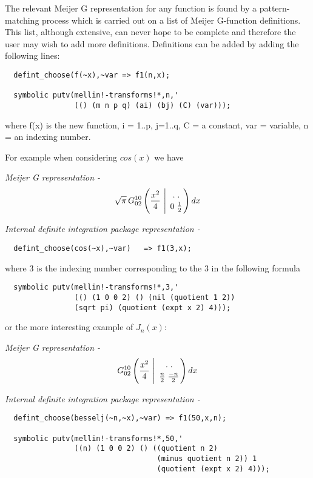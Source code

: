 The relevant Meijer G representation for any function is found by a 
pattern-matching process which is carried out on a list of Meijer 
G-function definitions. This list, although extensive, can never hope 
to be complete and therefore the user may wish to add more definitions.
Definitions can be added by adding the following lines:

\begin{verbatim}
  defint_choose(f(~x),~var => f1(n,x);

  symbolic putv(mellin!-transforms!*,n,'
                (() (m n p q) (ai) (bj) (C) (var)));

\end{verbatim} 
     where f(x) is the new function, i = 1..p, j=1..q, C = a constant,
     var = variable, n = an indexing number.

For example when considering $cos (x)$ we have

\it Meijer G representation  -  
\begin{displaymath}
\sqrt{\pi} \,G^{1 0}_{0 2}\left(\frac{x^{2}}{4} \ \Bigg\vert 
\ { . \; . \atop 0 \; \frac{1}{2}} \right) dx 
\end{displaymath}

\it Internal definite integration package representation  - 
\begin{verbatim}
  defint_choose(cos(~x),~var)   => f1(3,x);
\end{verbatim}

\rm where 3 is the indexing number corresponding to the 3
in the following formula

\begin{verbatim}
  symbolic putv(mellin!-transforms!*,3,'
                (() (1 0 0 2) () (nil (quotient 1 2))
                (sqrt pi) (quotient (expt x 2) 4)));
\end{verbatim} 

or the more interesting example of $J_{n}(x)$:

\it Meijer G representation  -  
\begin{displaymath}
G^{1 0}_{0 2} \left(\frac{x^{2}}{4} \ \Bigg\vert 
\ {. \; .  \atop \frac{n}{2} \; {\frac{-n}{2}}} \right) dx 
\end{displaymath}

\it Internal definite integration package representation  - 

\begin{verbatim}
  defint_choose(besselj(~n,~x),~var) => f1(50,x,n);

  symbolic putv(mellin!-transforms!*,50,'
                ((n) (1 0 0 2) () ((quotient n 2)
                                   (minus quotient n 2)) 1
                                   (quotient (expt x 2) 4)));
\end{verbatim} 

